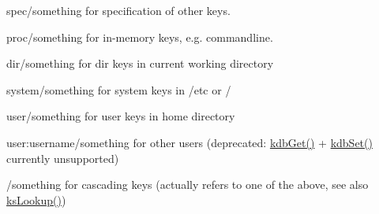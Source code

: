 \begin{DoxyItemize}
\item {\ttfamily spec/something} for specification of other keys.
\item {\ttfamily proc/something} for in-\/memory keys, e.\+g. commandline.
\item {\ttfamily dir/something} for dir keys in current working directory
\item {\ttfamily system/something} for system keys in /etc or /
\item {\ttfamily user/something} for user keys in home directory
\item {\ttfamily user\+:username/something} for other users (deprecated\+: \hyperlink{group__kdb_ga28e385fd9cb7ccfe0b2f1ed2f62453a1}{kdb\+Get()} + \hyperlink{group__kdb_ga11436b058408f83d303ca5e996832bcf}{kdb\+Set()} currently unsupported)
\item {\ttfamily /something} for cascading keys (actually refers to one of the above, see also \hyperlink{group__keyset_gaa34fc43a081e6b01e4120daa6c112004}{ks\+Lookup()})


\end{DoxyItemize}
